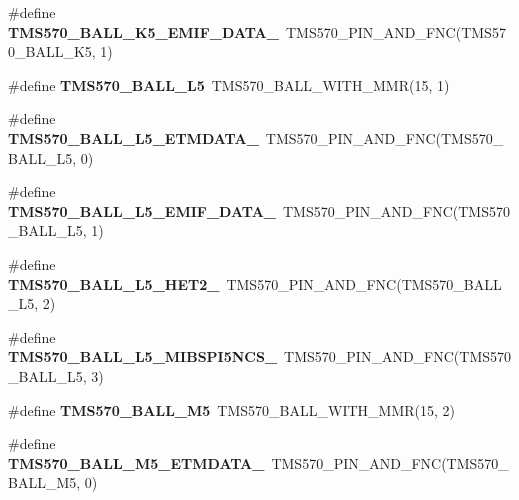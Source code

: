 \begin{DoxyCompactItemize}
\#define {\bfseries T\+M\+S570\+\_\+\+B\+A\+L\+L\+\_\+\+K5\+\_\+\+E\+M\+I\+F\+\_\+\+D\+A\+T\+A\+\_}~T\+M\+S570\+\_\+\+P\+I\+N\+\_\+\+A\+N\+D\+\_\+\+F\+NC(T\+M\+S570\+\_\+\+B\+A\+L\+L\+\_\+\+K5, 1)
\item 
\mbox{\label{tms570lc4357-pins_8h_ad2eb813d5f1899f0b9c59801418514b4}} 
\#define {\bfseries T\+M\+S570\+\_\+\+B\+A\+L\+L\+\_\+\+L5}~T\+M\+S570\+\_\+\+B\+A\+L\+L\+\_\+\+W\+I\+T\+H\+\_\+\+M\+MR(15, 1)
\item 
\mbox{\label{tms570lc4357-pins_8h_aefe5e167ca68d278ad7c5054918279ef}} 
\#define {\bfseries T\+M\+S570\+\_\+\+B\+A\+L\+L\+\_\+\+L5\+\_\+\+E\+T\+M\+D\+A\+T\+A\+\_}~T\+M\+S570\+\_\+\+P\+I\+N\+\_\+\+A\+N\+D\+\_\+\+F\+NC(T\+M\+S570\+\_\+\+B\+A\+L\+L\+\_\+\+L5, 0)
\item 
\mbox{\label{tms570lc4357-pins_8h_ad234c5fdffb7db000af89f02d6f2ad73}} 
\#define {\bfseries T\+M\+S570\+\_\+\+B\+A\+L\+L\+\_\+\+L5\+\_\+\+E\+M\+I\+F\+\_\+\+D\+A\+T\+A\+\_}~T\+M\+S570\+\_\+\+P\+I\+N\+\_\+\+A\+N\+D\+\_\+\+F\+NC(T\+M\+S570\+\_\+\+B\+A\+L\+L\+\_\+\+L5, 1)
\item 
\mbox{\label{tms570lc4357-pins_8h_aea315a32590a7d91f7a20efed35f02ee}} 
\#define {\bfseries T\+M\+S570\+\_\+\+B\+A\+L\+L\+\_\+\+L5\+\_\+\+H\+E\+T2\+\_}~T\+M\+S570\+\_\+\+P\+I\+N\+\_\+\+A\+N\+D\+\_\+\+F\+NC(T\+M\+S570\+\_\+\+B\+A\+L\+L\+\_\+\+L5, 2)
\item 
\mbox{\label{tms570lc4357-pins_8h_ad9559f1970491c6a0ef1adb97c80baf9}} 
\#define {\bfseries T\+M\+S570\+\_\+\+B\+A\+L\+L\+\_\+\+L5\+\_\+\+M\+I\+B\+S\+P\+I5\+N\+C\+S\+\_}~T\+M\+S570\+\_\+\+P\+I\+N\+\_\+\+A\+N\+D\+\_\+\+F\+NC(T\+M\+S570\+\_\+\+B\+A\+L\+L\+\_\+\+L5, 3)
\item 
\mbox{\label{tms570lc4357-pins_8h_a182bcf3a635be6319644d9e5f61969c9}} 
\#define {\bfseries T\+M\+S570\+\_\+\+B\+A\+L\+L\+\_\+\+M5}~T\+M\+S570\+\_\+\+B\+A\+L\+L\+\_\+\+W\+I\+T\+H\+\_\+\+M\+MR(15, 2)
\item 
\mbox{\label{tms570lc4357-pins_8h_ab4960888ff7fd88f184e5da184d4cab8}} 
\#define {\bfseries T\+M\+S570\+\_\+\+B\+A\+L\+L\+\_\+\+M5\+\_\+\+E\+T\+M\+D\+A\+T\+A\+\_}~T\+M\+S570\+\_\+\+P\+I\+N\+\_\+\+A\+N\+D\+\_\+\+F\+NC(T\+M\+S570\+\_\+\+B\+A\+L\+L\+\_\+\+M5, 0)

\end{DoxyCompactItemize}
